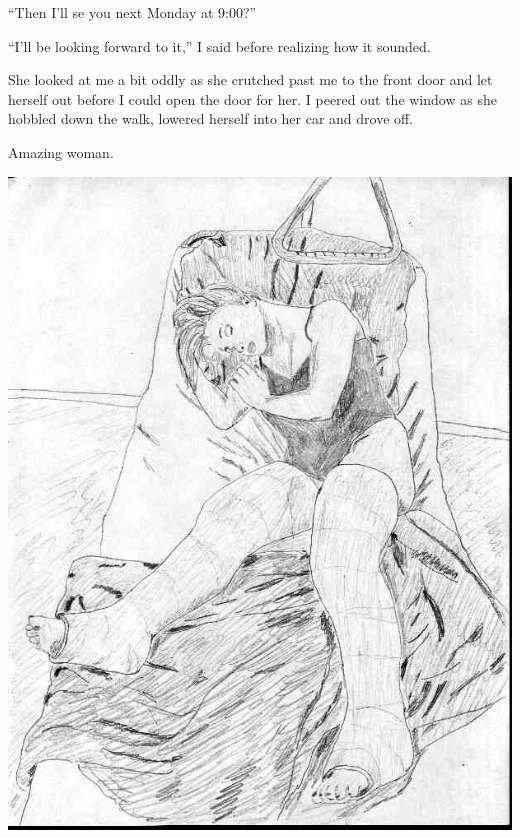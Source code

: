 ``Then I'll se you next Monday at 9:00?''

``I'll be looking forward to it,'' I said before realizing how it sounded.

She looked at me a bit oddly as she crutched past me to the front door and let herself out
before I could open the door for her. I peered out the window as she hobbled down the walk,
lowered herself into her car and drove off.

Amazing woman.

\newpage
\begin{center}
\includegraphics{images/kicks18.jpg}
\end{center}
